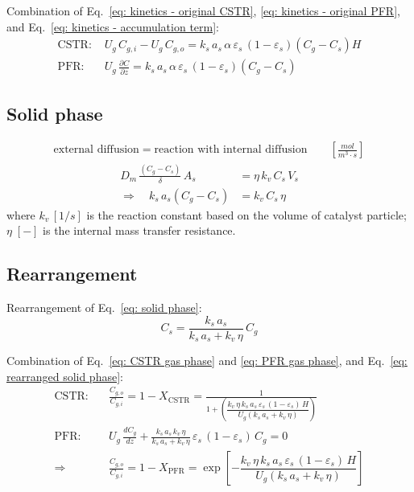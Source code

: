 Combination of Eq.~\eqref{eq: kinetics - original CSTR}, \eqref{eq: kinetics - original PFR}, and Eq.~\eqref{eq: kinetics - accumulation term}: 
\begin{align}
    \text{CSTR: }
    & U_g\, C_{g,i} - U_g\, C_{g,o} 
    = k_s \, a_s \, \alpha \, \varepsilon_s \,(1-\varepsilon_s) (C_g - C_s) H 
    \label{eq: CSTR gas phase} \\ 
    \text{PFR: }
    & U_g\,\frac{\partial C}{\partial z}
    = k_s \, a_s \, \alpha \, \varepsilon_s \,(1-\varepsilon_s) (C_g - C_s) 
    \label{eq: PFR gas phase}
\end{align}

\subsection{Solid phase}
\begin{align*}
    \text{external diffusion}
    = 
    \text{reaction with internal diffusion}
    \qquad \left[\si{\frac{mol}{m^3\cdot s}}\right]
\end{align*}
\begin{align}
    D_m\, \frac{(C_g - C_s)}{\delta}\, A_s
    &= \eta \, k_v \, C_s \, V_s \\
    \Longrightarrow \quad 
    k_s \, a_s (C_g - C_s) 
    &= k_v \, C_s \, \eta 
    \label{eq: solid phase}
\end{align}
where $k_v\, [\si{1/s}]$ is the reaction constant based on the volume of catalyst particle; $\eta\; [-]$ is the internal mass transfer resistance.

\subsection{Rearrangement}
Rearrangement of Eq.~\eqref{eq: solid phase}:
\begin{equation}
    C_s = \frac{k_s\, a_s}{k_s\, a_s + k_v\,\eta}\, C_g
    \label{eq: rearranged solid phase}
\end{equation}

Combination of Eq.~\eqref{eq: CSTR gas phase} and \eqref{eq: PFR gas phase}, and Eq.~\eqref{eq: rearranged solid phase}:
\begin{align}
    \text{CSTR:} \quad
    & \frac{C_{g,o}}{C_{g,i}} = 1- X_\text{CSTR}
    = \frac{1}{1+ \left(
        \dfrac{k_v\,\eta\,k_s\,a_s\,\varepsilon_s\,(1-\varepsilon_s)\,H}{U_g(k_s\, a_s + k_v\,\eta)}
        \right)} 
    \label{eq: CSTR in fixed bed}\\
    \text{PFR:} \quad
    & U_g\,\frac{dC_{g}}{dz} + \frac{k_s\,a_s\,k_v\,\eta}{k_s\,a_s + k_v\,\eta}\,\varepsilon_s\,(1-\varepsilon_s)\,C_g = 0 \\
    \Longrightarrow \quad 
    & \frac{C_{g,o}}{C_{g,i}} = 1- X_\text{PFR}
    = \exp \left[
        - \dfrac{k_v\,\eta\,k_s\,a_s\,\varepsilon_s\,(1-\varepsilon_s)\,H}{U_g(k_s\, a_s + k_v\,\eta)}  
    \right]
    \label{eq: PFR in fixed bed}
\end{align}

